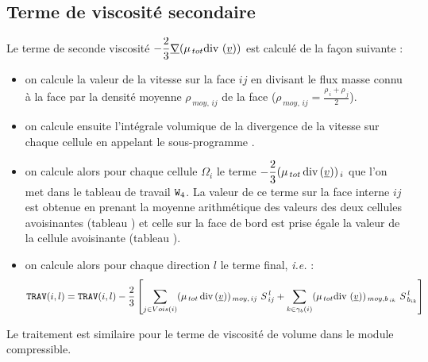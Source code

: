 \subsection*{Terme de viscosité secondaire}
Le terme de seconde viscosité
 $-\displaystyle \frac{2}{3}\underline{\nabla} (\mu_{\,tot} \text{div}\,\,(\underline{v}))$
 est calculé de la façon suivante :
\begin{itemize}
\item on calcule la valeur de la vitesse sur la face $ij$ en divisant le flux
masse connu à la face par la densité moyenne $\rho_{\,moy,\,ij}$ de la face
($\rho_{\,moy,\,ij}=\displaystyle \frac{\rho_{\,i}+\rho_{\,j}}{2}$).
\item on calcule ensuite l'intégrale volumique de la divergence de la vitesse sur chaque cellule en appelant le sous-programme
.
\item on calcule alors pour chaque cellule $\Omega_i$ le terme $-\displaystyle
\frac{2}{3}(\mu_{\,tot}\,\text{div}\,(\underline{v}))_{\,i}$ que l'on met dans le
tableau de travail $\text{\texttt{W}}_4$. La valeur de ce terme sur la face interne $ij$
 est obtenue en prenant la moyenne arithmétique des valeurs des deux cellules
avoisinantes (tableau ) et celle sur la face de bord est prise égale
la valeur de la cellule avoisinante (tableau ).
\item on calcule alors pour chaque direction $l$ le terme final,
\emph{i.e.} :\\
\begin{equation}\notag
\text{\texttt{TRAV}}(i,l)= \text{\texttt{TRAV}}(i,l)-\displaystyle \frac{2}{3}\left[\sum\limits_{j \in Vois(i)} (\mu_{\,tot}\,\text{div}\,(\underline{v}))_{\,moy,\,ij}\ S_{\,ij}^{\,l}
+\sum\limits_{k \in \gamma_b(i)} (\mu_{\,tot}
\text{div}\,\,(\underline{v}))_{\,moy,{b_{\,ik}}}\  S_{\,b_{ik}}^{\,l}\right]
\end{equation}
\end{itemize}

\vspace{0.5cm}
Le traitement est similaire pour le terme de viscosité de volume dans le module compressible.

